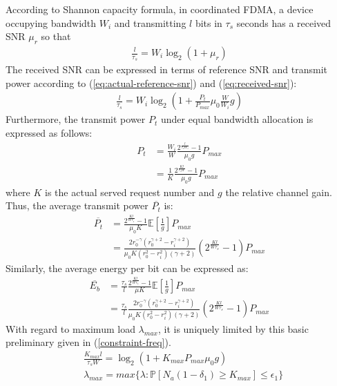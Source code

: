 According to Shannon capacity formula, in coordinated FDMA, a device occupying bandwidth $W_i$ and transmitting $l$ bits in $\tau_s$ seconds has a received SNR $\mu_r$ so that
\begin{align}
	\frac{l}{\tau_s} = W_i\log_2\left( 1 + \mu_r\right) \nonumber
\end{align}
The received SNR can be expressed in terms of reference SNR and transmit power according to (\ref{eq:actual-reference-snr}) and (\ref{eq:received-snr}):
\begin{align}
\frac{l}{\tau_s} = W_i\log_2\left( 1 + \frac{P_t}{P_{max}}\mu_0\frac{W}{W_i}g\right) \nonumber
\end{align}
Furthermore, the transmit power $P_t$ under equal bandwidth allocation is expressed as follows:
\begin{align}
P_t  &=  \frac{W_i}{W}\frac{2^{\frac{l}{\tau_s W_i}}-1}{\mu_0 g}P_{max}\nonumber\\
&=  \frac{1}{K}\frac{2^{\frac{Kl}{\tau_s W}}-1}{\mu_0 g}P_{max}
\end{align}
where $K$ is the actual served request number and $g$ the relative channel gain. Thus, the average transmit power $\overline{P_t}$ is:
\begin{align}
\overline{P_t} &= \frac{2^{\frac{Kl}{W\tau_s}}-1}{\mu_0 K}\mathbb{E}\left[ \frac{1}{g}\right] P_{max} \nonumber \\
&=\frac{2r_0^{-\gamma}(r_0^{\gamma+2}-r_i^{\gamma+2})}{\mu_0K(r_0^2-r_i^2)(\gamma+2)}\left( 2^{\frac{Kl}{W\tau_s}}-1\right) P_{max}
\end{align}
Similarly, the average energy per bit can be expressed as:
\begin{align}
\overline{E_b} &= \frac{\tau_s}{l}\frac{2^{\frac{Kl}{W\tau_s}}-1}{\mu K}\mathbb{E}\left[ \frac{1}{g}\right] P_{max} \nonumber \\
&=\frac{\tau_s}{l}\frac{2r_0^{-\gamma}(r_0^{\gamma+2}-r_i^{\gamma+2})}{\mu_0K(r_0^2-r_i^2)(\gamma+2)}\left( 2^{\frac{Kl}{W\tau_s}}-1\right) P_{max}
\end{align}
With regard to maximum load $\lambda_{max}$, it is uniquely limited by this basic preliminary given in (\ref{constraint-freq}).
\begin{align}
	&\frac{K_{max}l}{\tau_s W} =\log_2\left( 1+ K_{max}P_{max}\mu_0 g\right) \\
	&\lambda_{max} =max\{\lambda: \mathbb{P}\left[ N_a(1-\delta_1) \geq K_{max}\right] \leq \epsilon_1 \}
\end{align}